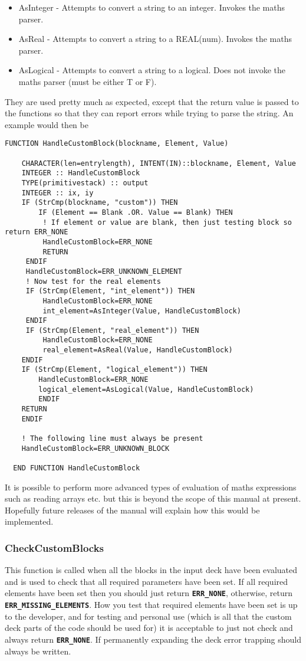 \documentclass[12pt,a4paper]{article}
\newcommand{\simpleboxverbatim}{\begin{Verbatim}[obeytabs=true,frame=single,
  framerule=0.5mm,rulecolor=\color{warwickmid},formatcom=\color{black}]}
\newcommand{\inlinecode}[1]{{\color{warwickred} \bf\texttt{#1}}}
\begin{document}
\begin{itemize}
\item AsInteger - Attempts to convert a string to an integer. Invokes the
  maths parser.
\item AsReal - Attempts to convert a string to a REAL(num). Invokes the maths
  parser.
\item AsLogical - Attempts to convert a string to a logical. Does not invoke
  the maths parser (must be either T or F).
\end{itemize}

They are used pretty much as expected, except that the return value is passed
to the functions so that they can report errors while trying to parse the
string. An example would then be

\simpleboxverbatim
  FUNCTION HandleCustomBlock(blockname, Element, Value)

    CHARACTER(len=entrylength), INTENT(IN)::blockname, Element, Value
    INTEGER :: HandleCustomBlock
    TYPE(primitivestack) :: output
    INTEGER :: ix, iy
    IF (StrCmp(blockname, "custom")) THEN
    	IF (Element == Blank .OR. Value == Blank) THEN
	     ! If element or value are blank, then just testing block so return ERR_NONE
	     HandleCustomBlock=ERR_NONE
	     RETURN
	 ENDIF
	 HandleCustomBlock=ERR_UNKNOWN_ELEMENT
	 ! Now test for the real elements
	 IF (StrCmp(Element, "int_element")) THEN
	     HandleCustomBlock=ERR_NONE
	     int_element=AsInteger(Value, HandleCustomBlock)
	 ENDIF
	 IF (StrCmp(Element, "real_element")) THEN
	     HandleCustomBlock=ERR_NONE
	     real_element=AsReal(Value, HandleCustomBlock)
	ENDIF
	IF (StrCmp(Element, "logical_element")) THEN
	    HandleCustomBlock=ERR_NONE
	    logical_element=AsLogical(Value, HandleCustomBlock)
	    ENDIF
	RETURN
    ENDIF

    ! The following line must always be present
    HandleCustomBlock=ERR_UNKNOWN_BLOCK

  END FUNCTION HandleCustomBlock
\end{Verbatim}

It is possible to perform more advanced types of evaluation of maths
expressions such as reading arrays etc. but this is beyond the scope of this
manual at present. Hopefully future releases of the manual will explain how
this would be implemented.

\subsubsection{CheckCustomBlocks}
This function is called when all the blocks in the input deck have been
evaluated and is used to check that all required parameters have been set. If
all required elements have been set then you should just return
\inlinecode{ERR\_NONE}, otherwise, return
\inlinecode{ERR\_MISSING\_ELEMENTS}. How you test that required elements have
been set is up to the developer, and for testing and personal use (which is
all that the custom deck parts of the code should be used for) it is
acceptable to just not check and always return \inlinecode{ERR\_NONE}. If
permanently expanding the deck error trapping should always be written.
\end{document}
